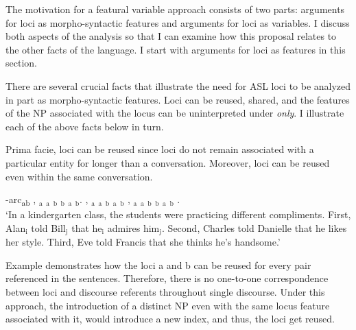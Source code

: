 \documentclass[output=paper,
modfonts
]{langscibook}
\begin{document}
The motivation for a featural variable approach consists of two parts: arguments for loci as morpho-syntactic features and arguments for loci as variables. I discuss both aspects of the analysis so that I can examine how this proposal relates to the other facts of the language. I start with arguments for loci as features in this section. 

There are several crucial facts that illustrate the need for ASL loci to be analyzed in part as morpho-syntactic features. Loci can be reused, shared, and the features of the NP associated with the locus can be uninterpreted under \textit{only}. I illustrate each of the above facts below in turn. 

Prima facie, loci can be reused since loci do not remain associated with a particular entity for longer than a conversation. Moreover, loci can be reused even within the same conversation.

\begin{exe} 
	\ex \label{ex:irani:68}  -arc\textsubscript{ab}  , $_\text{a}$ $_\text{a}$  $_\text{b}$ $_\text{b}$ $_\text{a}$  $_\text{b}$. , $_\text{a}$ $_\text{a}$  $_\text{b}$  $_\text{a}$ $_\text{b}$ , $_\text{a}$ $_\text{a}$  $_\text{b}$ $_\text{b}$ $_\text{a}$  $_\text{b}$ .\\
	`In a kindergarten class, the students were practicing different compliments. First, Alan$_\text{i}$ told Bill$_\text{j}$ that he$_\text{i}$ admires him$_\text{j}$. Second, Charles told Danielle that he likes her style. Third, Eve told Francis that she thinks he's handsome.' \citep[adapted from][462]{Kuhn2015}
\end{exe} 

Example  demonstrates how the loci a and b can be reused for every pair referenced in the sentences. Therefore, there is no one-to-one correspondence between loci and discourse referents throughout single discourse. Under this approach, the introduction of a distinct NP even with the same locus feature associated with it, would introduce a new index, and thus, the loci get reused. 
\end{document}
